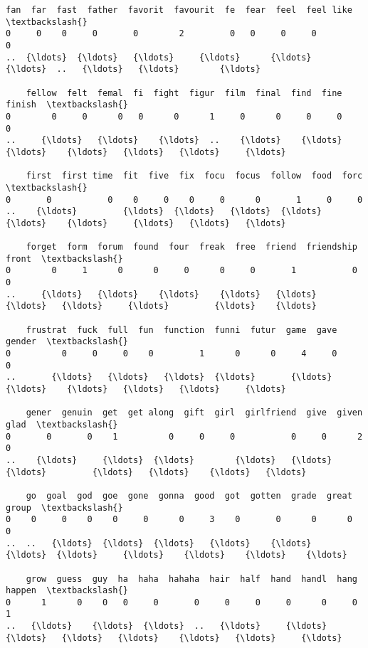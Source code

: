 \documentclass[11pt]{article}
\begin{document}
\begin{Verbatim}[commandchars=\\\{\}]
    fan  far  fast  father  favorit  favourit  fe  fear  feel  feel like  \textbackslash{}
0     0    0     0       0        2         0   0     0     0          0   
..  {\ldots}  {\ldots}   {\ldots}     {\ldots}      {\ldots}       {\ldots}  ..   {\ldots}   {\ldots}        {\ldots}   

    fellow  felt  femal  fi  fight  figur  film  final  find  fine  finish  \textbackslash{}
0        0     0      0   0      0      1     0      0     0     0       0   
..     {\ldots}   {\ldots}    {\ldots}  ..    {\ldots}    {\ldots}   {\ldots}    {\ldots}   {\ldots}   {\ldots}     {\ldots}   

    first  first time  fit  five  fix  focu  focus  follow  food  forc  \textbackslash{}
0       0           0    0     0    0     0      0       1     0     0   
..    {\ldots}         {\ldots}  {\ldots}   {\ldots}  {\ldots}   {\ldots}    {\ldots}     {\ldots}   {\ldots}   {\ldots}   

    forget  form  forum  found  four  freak  free  friend  friendship  front  \textbackslash{}
0        0     1      0      0     0      0     0       1           0      0   
..     {\ldots}   {\ldots}    {\ldots}    {\ldots}   {\ldots}    {\ldots}   {\ldots}     {\ldots}         {\ldots}    {\ldots}   

    frustrat  fuck  full  fun  function  funni  futur  game  gave  gender  \textbackslash{}
0          0     0     0    0         1      0      0     4     0       0   
..       {\ldots}   {\ldots}   {\ldots}  {\ldots}       {\ldots}    {\ldots}    {\ldots}   {\ldots}   {\ldots}     {\ldots}   

    gener  genuin  get  get along  gift  girl  girlfriend  give  given  glad  \textbackslash{}
0       0       0    1          0     0     0           0     0      2     0   
..    {\ldots}     {\ldots}  {\ldots}        {\ldots}   {\ldots}   {\ldots}         {\ldots}   {\ldots}    {\ldots}   {\ldots}   

    go  goal  god  goe  gone  gonna  good  got  gotten  grade  great  group  \textbackslash{}
0    0     0    0    0     0      0     3    0       0      0      0      0   
..  ..   {\ldots}  {\ldots}  {\ldots}   {\ldots}    {\ldots}   {\ldots}  {\ldots}     {\ldots}    {\ldots}    {\ldots}    {\ldots}   

    grow  guess  guy  ha  haha  hahaha  hair  half  hand  handl  hang  happen  \textbackslash{}
0      1      0    0   0     0       0     0     0     0      0     0       1   
..   {\ldots}    {\ldots}  {\ldots}  ..   {\ldots}     {\ldots}   {\ldots}   {\ldots}   {\ldots}    {\ldots}   {\ldots}     {\ldots}   


\end{Verbatim}
\end{document}
